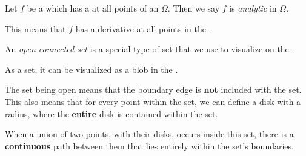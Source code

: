 \begin{definition}[Analytic]\label{def:Analytic}
  Let $f$ be a  which has a  at all points of an  $\Omega$.
  Then we say $f$ is \emph{analytic} in $\Omega$.

  This means that $f$ has a derivative at all points in the .
\end{definition}

\begin{definition}\label{def:Open_Connected_Set}
  An \emph{open connected set} is a special type of set that we use to visualize on the .
  \begin{description}[noitemsep]
  \item[Set:] As a set, it can be visualized as a blob in the .
  \item[Open:] The set being open means that the boundary edge is \textbf{not} included with the set.
    This also means that for every point within the set, we can define a disk with a radius, where the \textbf{entire} disk is contained within the set.
  \item[Connected:] When a union of two points, with their disks, occurs inside this set, there is a \textbf{continuous} path between them that lies entirely within the set's boundaries.
  \end{description}
\end{definition}

